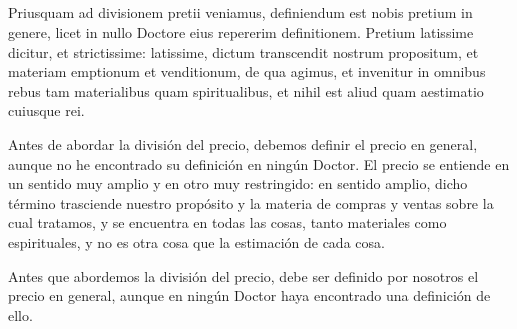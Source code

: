 \documentclass{article}
\begin{document}
\begin{paracol}{3}
\begin{nthcolumn}{2}
    \subsection*{\centering }
  \end{nthcolumn}
  \vspace{0.5cm}
  \begin{nthcolumn*}{0} %
    Priusquam ad divisionem pretii veniamus, definiendum est nobis pretium in genere, licet in nullo Doctore eius repererim definitionem. Pretium latissime dicitur, et strictissime: latissime, dictum transcendit nostrum propositum, et materiam emptionum et venditionum, de qua agimus, et invenitur in omnibus rebus tam materialibus quam spiritualibus, et nihil est aliud quam aestimatio cuiusque rei.
  \end{nthcolumn*}
  \vspace{0.5cm}
  \begin{nthcolumn}{1} %
    Antes de abordar la división del precio, debemos definir el precio en general, aunque no he encontrado su definición en ningún Doctor. El precio se entiende en un sentido muy amplio y en otro muy restringido: en sentido amplio, dicho término trasciende nuestro propósito y la materia de compras y ventas sobre la cual tratamos, y se encuentra en todas las cosas, tanto materiales como espirituales, y no es otra cosa que la estimación de cada cosa.
  \end{nthcolumn}
  \vspace{0.5cm}
  \begin{nthcolumn}{2} %
    Antes que abordemos la división del precio, debe ser definido por nosotros el precio en general, aunque en ningún Doctor haya encontrado una definición de ello.
  \end{nthcolumn}
\end{paracol}
\end{document}
